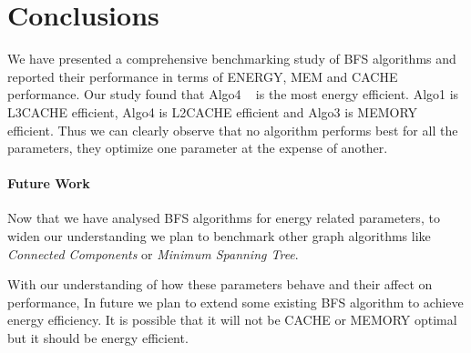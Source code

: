\section{Conclusions}
\label{conc}

%
%
%

We have presented a comprehensive benchmarking study of BFS algorithms
and reported their performance in terms of ENERGY, MEM and CACHE
performance.  Our study found that Algo4 ~\cite{LIGRA-BFS} is the most
energy efficient.  Algo1 is L3CACHE efficient, Algo4 is L2CACHE
efficient and Algo3 is MEMORY efficient.  Thus we can clearly observe
that no algorithm performs best for all the parameters, they optimize
one parameter at the expense of another.


\paragraph{Future Work}
Now that we have analysed BFS algorithms for energy related
parameters, to widen our understanding we plan to benchmark other
graph algorithms like \emph{Connected Components} or \emph{Minimum
Spanning Tree}.

With our understanding of how these parameters behave and their affect
on performance, In future we plan to extend some existing BFS
algorithm to achieve energy efficiency.  It is possible that it will
not be CACHE or MEMORY optimal but it should be energy efficient.


%
%
%
%
%
%
%

